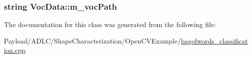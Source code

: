 \hypertarget{classVocData_ab5991ec812cb9c53716188ea67f52e51}{
\subsubsection[{m\-\_\-voc\-Path}]{\setlength{\rightskip}{0pt plus 5cm}string Voc\-Data\-::m\-\_\-voc\-Path\hspace{0.3cm}{\ttfamily [protected]}}}\label{classVocData_ab5991ec812cb9c53716188ea67f52e51}


The documentation for this class was generated from the following file\-:\begin{DoxyCompactItemize}
\item 
Payload/\-A\-D\-L\-C/\-Shape\-Characterization/\-Open\-C\-V\-Example/\hyperlink{bagofwords__classification_8cpp}{bagofwords\-\_\-classification.\-cpp}\end{DoxyCompactItemize}

